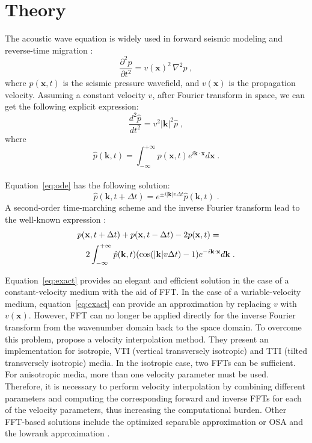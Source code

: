 \section{Theory}

The acoustic wave equation is widely used in 
forward seismic modeling and reverse-time migration \cite[]{bednar,etgen1}:
\begin{equation}
\label{eq:acoustic} 
\frac{\partial^2p}{\partial t^2} = v(\mathbf{x})^2\,\nabla^2p\;,
\end{equation}
where $p(\mathbf{x},t)$ is the seismic pressure wavefield, 
and $v(\mathbf{x})$ is the propagation velocity.
Assuming a constant velocity $v$, after Fourier transform in space,
 we can get the following explicit expression:
\begin{equation}
\label{eq:ode} 
\frac{d^2\hat{p}}{dt^2} = v^2|\mathbf{k}|^2\hat{p}\;,
\end{equation}
where
\begin{equation}
\label{eq:p} 
\hat{p}(\mathbf{k},t)=\int^{+\infty}_{-\infty}{p(\mathbf{x},t)e^{i\mathbf{k}\cdot\mathbf{x}}d\mathbf{x}}\;.
\end{equation}
\\
Equation~\ref{eq:ode} has the following solution:
\begin{equation}
\label{eq:fourier} 
\hat{p}(\mathbf{k},t+\Delta t) = e^{\pm i|\mathbf{k}|v\Delta t}\hat{p}(\mathbf{k},t)\;.
\end{equation}
A second-order time-marching scheme and the inverse Fourier transform lead to 
the well-known expression \cite[]{Etgen.sep.60.131,yu}:
\begin{eqnarray}
\label{eq:exact} 
\lefteqn{p(\mathbf{x},t+\Delta t)+p(\mathbf{x},t-\Delta t)-2p(\mathbf{x},t)  = }\nonumber \\
& & 2\int^{+\infty}_{-\infty}{\hat{p}(\mathbf{k},t)(\cos(|\mathbf{k}|v\Delta t)-1)e^{-i\mathbf{k}\cdot\mathbf{x}}d\mathbf{k}}\;.
\end{eqnarray} 


Equation~\ref{eq:exact} provides an elegant and efficient solution 
in the case of a constant-velocity medium with the aid of FFT. 
In the case of a variable-velocity medium, 
equation~\ref{eq:exact} can provide an approximation by replacing $v$ with $v(\mathbf{x})$. 
However, FFT can no longer be applied directly for 
the inverse Fourier transform from the wavenumber domain back to the space domain.
To overcome this problem, \cite{etgen} propose a velocity interpolation method. 
They present an implementation for isotropic, VTI (vertical transversely isotropic) and TTI (tilted transversely isotropic) media.  
In the isotropic case, two FFTs can be sufficient. 
For anisotropic media, more than one velocity parameter must be used. 
Therefore, it is necessary to perform velocity interpolation 
by combining different parameters and 
computing the corresponding forward and inverse FFTs 
for each of the velocity parameters, thus increasing the computational burden.
Other FFT-based solutions include the optimized separable approximation or OSA \cite[]{song,morton,zhang,du} 
and the lowrank approximation \cite[]{ying}.\\

